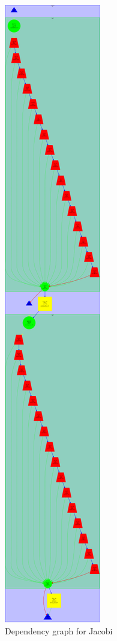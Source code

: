 \documentclass[12]{article}
\begin{document}
\begin{figure}[H]
    \centering
    \includegraphics[scale=0.35]{images/dependency_jacobi.png}
    \caption{Dependency graph for Jacobi}
    \label{jacobi_dependency}
\end{figure}
\end{document}
